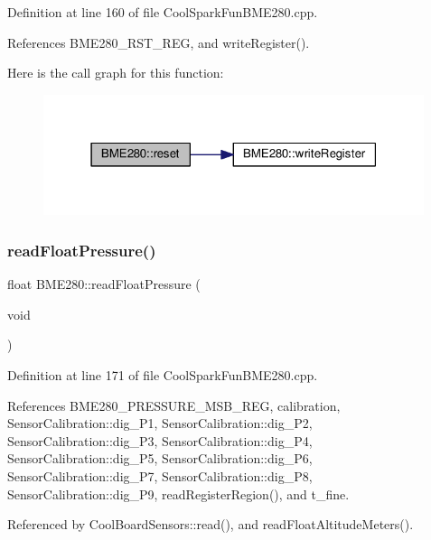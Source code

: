 Definition at line 160 of file Cool\+Spark\+Fun\+B\+M\+E280.\+cpp.



References B\+M\+E280\+\_\+\+R\+S\+T\+\_\+\+R\+EG, and write\+Register().

Here is the call graph for this function\+:\nopagebreak
\begin{figure}[H]
\begin{center}
\leavevmode
\includegraphics[width=316pt]{df/dcf/class_b_m_e280_aeec5deb6daace6ae390108b4210e9df7_cgraph}
\end{center}
\end{figure}
\mbox{\label{class_b_m_e280_ada6e799917afb4f228e6253bc56ffe75}} 
\subsubsection{\texorpdfstring{read\+Float\+Pressure()}{readFloatPressure()}}
{\footnotesize\ttfamily float B\+M\+E280\+::read\+Float\+Pressure (\begin{DoxyParamCaption}\item[{void}]{ }\end{DoxyParamCaption})}



Definition at line 171 of file Cool\+Spark\+Fun\+B\+M\+E280.\+cpp.



References B\+M\+E280\+\_\+\+P\+R\+E\+S\+S\+U\+R\+E\+\_\+\+M\+S\+B\+\_\+\+R\+EG, calibration, Sensor\+Calibration\+::dig\+\_\+\+P1, Sensor\+Calibration\+::dig\+\_\+\+P2, Sensor\+Calibration\+::dig\+\_\+\+P3, Sensor\+Calibration\+::dig\+\_\+\+P4, Sensor\+Calibration\+::dig\+\_\+\+P5, Sensor\+Calibration\+::dig\+\_\+\+P6, Sensor\+Calibration\+::dig\+\_\+\+P7, Sensor\+Calibration\+::dig\+\_\+\+P8, Sensor\+Calibration\+::dig\+\_\+\+P9, read\+Register\+Region(), and t\+\_\+fine.



Referenced by Cool\+Board\+Sensors\+::read(), and read\+Float\+Altitude\+Meters().

